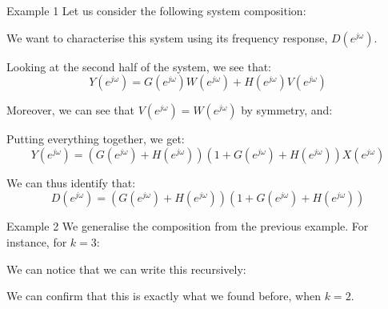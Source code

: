 \documentclass[a4paper]{article}
\begin{document}
\begin{parag}{Example 1}
    Let us consider the following system composition:

    We want to characterise this system using its frequency response, $D\left(e^{j\omega}\right)$.

    Looking at the second half of the system, we see that: 
    \[Y\left(e^{j\omega}\right) = G\left(e^{j\omega}\right) W\left(e^{j \omega}\right) + H\left(e^{j\omega}\right) V\left(e^{j \omega}\right)\]
    
    Moreover, we can see that $V\left(e^{j\omega}\right) = W\left(e^{j\omega}\right)$ by symmetry, and: 
    
    Putting everything together, we get: 
    \[Y\left(e^{j\omega}\right) = \left(G\left(e^{j\omega}\right) + H\left(e^{j\omega}\right)\right)\left(1 + G\left(e^{j\omega}\right) + H\left(e^{j\omega}\right)\right) X\left(e^{j\omega}\right)\]
    
    We can thus identify that: 
    \[D\left(e^{j\omega}\right) = \left(G\left(e^{j\omega}\right) + H\left(e^{j\omega}\right)\right) \left(1 + G\left(e^{j\omega}\right) + H\left(e^{j\omega}\right)\right)\]
\end{parag}

\begin{parag}{Example 2}
    We generalise the composition from the previous example. For instance, for $k = 3$:

    We can notice that we can write this recursively: 
    
    We can confirm that this is exactly what we found before, when $k = 2$.
\end{parag}
\end{document}
